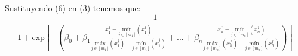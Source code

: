 \documentclass{article}
\begin{document}
Sustituyendo (6) en (3) tenemos que: 
\begin{equation}
    \frac{1}{1+\mbox{exp}\left [ -\left ( \beta _{0} + \beta _{1}\frac{x_{1}^{j} - \underset{j\in [m_{1} ]}{\mbox{mín}}\left (  x_{1}^{j}\right )}{\underset{j\in [m_{1} ]}{\mbox{máx}}\left (  x_{1}^{j}\right )-\underset{j\in [m_{1} ]}{\mbox{mín}}\left (  x_{1}^{j}\right )}+...+\beta_{n}\frac{x_{n}^{j} - \underset{j\in [m_{n} ]}{\mbox{mín}}\left (  x_{n}^{j}\right )}{\underset{j\in [m_{n} ]}{\mbox{máx}}\left (  x_{n}^{j}\right )-\underset{j\in [m_{n} ]}{\mbox{mín}}\left (  x_{n}^{j}\right )}\right ) \right ]}
\end{equation}
\end{document}
